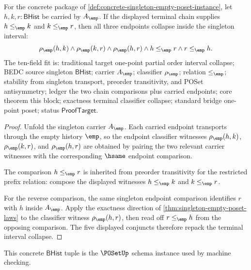 \begin{theorem}
\label{thm:poset-singleton-empty-terminal-interval-collapse}
For the concrete package of
\autoref{def:concrete-singleton-empty-poset-instance}, let
$h,k,r:\mathsf{BHist}$ be carried by $A_{\emp}$. If the displayed terminal
chain supplies $h\le_{\emp}k$ and $k\le_{\emp}r$, then all three endpoints
collapse inside the singleton interval:
$$
\rho_{\emp}(h,k)\land \rho_{\emp}(k,r)\land \rho_{\emp}(h,r)\land
h\le_{\emp}r\land r\le_{\emp}h.
$$
The ten-field fit is: traditional target one-point partial order interval
collapse; BEDC source singleton $\mathsf{BHist}$; carrier $A_{\emp}$;
classifier $\rho_{\emp}$; relation $\le_{\emp}$; stability from singleton
transport, preorder transitivity, and POSet antisymmetry; ledger the two chain
comparisons plus carried endpoints; core theorem this block; exactness
terminal classifier collapse; standard bridge one-point poset; status
$\mathsf{ProofTarget}$.
\end{theorem}
\begin{proof}
Unfold the singleton carrier $A_{\emp}$. Each carried endpoint transports
through the empty history $\emp$, so the endpoint classifier witnesses
$\rho_{\emp}(h,k)$, $\rho_{\emp}(k,r)$, and $\rho_{\emp}(h,r)$ are obtained by
pairing the two relevant carrier witnesses with the corresponding
$\hsame$ endpoint comparison.

The comparison $h\le_{\emp}r$ is inherited from preorder transitivity for the
restricted prefix relation: compose the displayed witnesses
$h\le_{\emp}k$ and $k\le_{\emp}r$.

For the reverse comparison, the same singleton endpoint comparison identifies
$r$ with $h$ inside $A_{\emp}$. Apply the exactness direction of
\autoref{thm:singleton-empty-poset-laws} to the classifier witness
$\rho_{\emp}(h,r)$, then read off $r\le_{\emp}h$ from the opposing comparison.
The five displayed conjuncts therefore repack the terminal interval collapse.
\end{proof}

This concrete $\mathsf{BHist}$ tuple is the $\POSetUp$ schema instance used by
machine checking.

